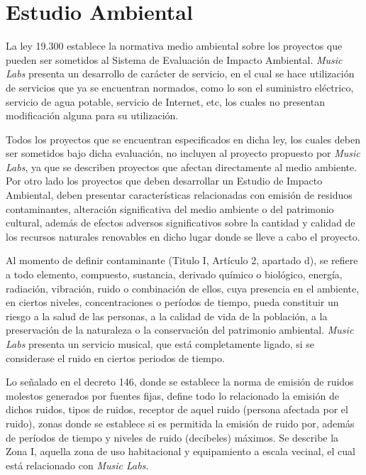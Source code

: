 \section{Estudio Ambiental}

La ley 19.300 establece la normativa medio 
ambiental sobre los proyectos que pueden ser 
sometidos al Sistema de Evaluación de Impacto
 Ambiental. \emph{Music Labs} presenta un desarrollo 
de carácter de servicio, en el cual se hace 
utilización de servicios que ya se encuentran
 normados, como lo son el suministro eléctrico, 
servicio de agua potable, servicio de Internet,
 etc, los cuales no presentan modificación alguna
 para su utilización.

Todos los proyectos que se encuentran especificados 
en dicha ley, los cuales deben ser sometidos bajo dicha
 evaluación, no incluyen al proyecto propuesto por \emph{Music
 Labs}, ya que se describen proyectos que afectan directamente al medio
ambiente. Por otro lado los proyectos que
 deben desarrollar un Estudio de Impacto Ambiental, deben 
presentar características relacionadas con emisión de residuos 
contaminantes, alteración significativa del medio ambiente o 
del patrimonio cultural, además de efectos adversos significativos
 sobre la cantidad y calidad de los recursos naturales renovables
 en dicho lugar donde se lleve a cabo el proyecto.

Al momento de definir contaminante (Titulo I, Artículo 2, apartado d),
 se refiere a todo elemento, compuesto, sustancia, derivado químico o 
biológico, energía, radiación, vibración, ruido o combinación de ellos,
 cuya presencia en el ambiente, en ciertos niveles, concentraciones 
o períodos de tiempo, pueda constituir un riesgo a la salud de las 
personas, a la calidad de vida de la población, a la preservación de
 la naturaleza o la conservación del patrimonio ambiental. \emph{Music Labs}
 presenta un servicio musical, que está completamente ligado, si se
 considerase el ruido en ciertos periodos de tiempo.

Lo señalado en el decreto 146, donde se establece la norma de emisión
 de ruidos molestos generados por fuentes fijas, define todo lo
 relacionado la emisión de dichos ruidos, tipos de ruidos, receptor
 de aquel ruido (persona afectada por el ruido), zonas donde se establece
 si es permitida la emisión de ruido por, además de períodos de tiempo y
 niveles de ruido (decibeles) máximos. Se describe la Zona I, aquella
 zona de uso habitacional y equipamiento a escala vecinal, el cual
 está relacionado con \emph{Music Labs}.

